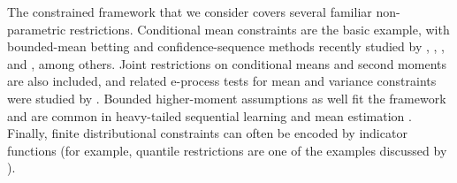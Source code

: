 \documentclass[10pt, a4paper]{article}
\begin{document}
The constrained framework that we consider covers several familiar non-parametric restrictions. Conditional mean constraints are the basic example, with bounded-mean betting and confidence-sequence methods recently studied by \citet{orabona2024tight}, \cite{waudby2024estimating}, \cite{shekhar2023near}, and \cite{chugg2025closed}, among others. Joint restrictions on conditional means and second moments are also included, and related e-process tests for mean and variance constraints were studied by \citet{fan2023testing}. Bounded higher-moment assumptions as well fit the framework and are common in heavy-tailed sequential learning and mean estimation \citep{agrawal2021regret,wang2023catoni}. Finally, finite distributional constraints can often be encoded by indicator functions (for example, quantile restrictions are one of the examples discussed by \citealt{larsson2026testing}). 
\end{document}
